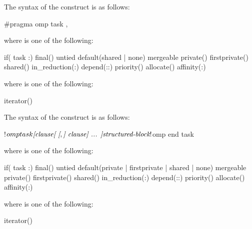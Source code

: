 \syntax
\begin{ccppspecific}
\begin{samepage}
The syntax of the  construct is as follows:

\begin{ompcPragma}
#pragma omp task \plc{[clause[ [},\plc{] clause] ... ] new-line}
\end{ompcPragma}
\end{samepage}

\begin{samepage}
where  is one of the following{}:

\begin{indentedcodelist}
if(\plc{[} task :\plc{] scalar-expression})
final()
untied
default(shared \textnormal{|} none)
mergeable
private()
firstprivate()
shared()
in_reduction(:)
depend(\plc{[depend-modifier}:\plc{]dependence-type }:)
priority()
allocate(\plc{[allocator: ]})
affinity(\plc{[aff-modifier }:\plc{] locator-list})
\end{indentedcodelist}

where  is one of the following{}:
\begin{indentedcodelist}
iterator() 
\end{indentedcodelist}


\end{samepage}
\end{ccppspecific}

\begin{fortranspecific}
The syntax of the  construct is as follows:

\begin{ompfPragma}
!$omp task \plc{[clause[ [},\plc{] clause] ... ]}
    \plc{structured-block}
!$omp end task
\end{ompfPragma}

where  is one of the following{}:

\begin{indentedcodelist}
if(\plc{[} task :\plc{] scalar-logical-expression})
final()
untied
default(private \textnormal{|} firstprivate \textnormal{|} shared \textnormal{|} none)
mergeable
private()
firstprivate()
shared()
in_reduction(:)
depend(\plc{[depend-modifier}:\plc{]dependence-type }:)
priority()
allocate(\plc{[allocator: ]})
affinity(\plc{[aff-modifier }:\plc{] locator-list})
\end{indentedcodelist}

where  is one of the following{}:
\begin{indentedcodelist}
iterator() 
\end{indentedcodelist}

\end{fortranspecific}


